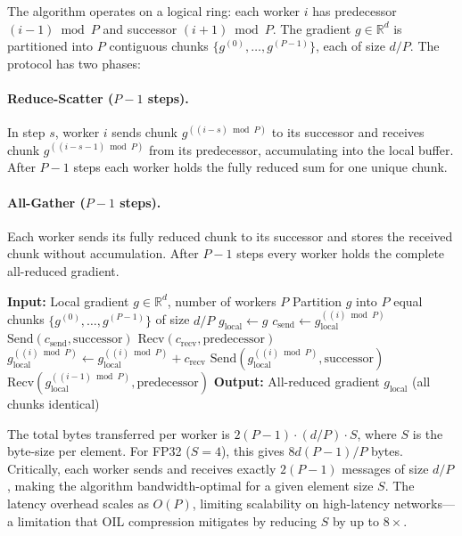 The algorithm operates on a logical ring: each worker $i$ has predecessor $(i-1) \bmod P$ and successor $(i+1) \bmod P$. The gradient $g \in \mathbb{R}^d$ is partitioned into $P$ contiguous chunks $\{g^{(0)},\dots,g^{(P-1)}\}$, each of size $d/P$. The protocol has two phases:

\paragraph{Reduce-Scatter ($P-1$ steps).} In step $s$, worker $i$ sends chunk $g^{((i-s) \bmod P)}$ to its successor and receives chunk $g^{((i-s-1) \bmod P)}$ from its predecessor, accumulating into the local buffer. After $P-1$ steps each worker holds the fully reduced sum for one unique chunk.

\paragraph{All-Gather ($P-1$ steps).} Each worker sends its fully reduced chunk to its successor and stores the received chunk without accumulation. After $P-1$ steps every worker holds the complete all-reduced gradient.

\begin{algorithm}[H]
\caption{Standard Ring All-Reduce (Reduce-Scatter + All-Gather)}
\label{alg:ring_reducescatter}
\begin{algorithmic}[1]
\STATE \textbf{Input:} Local gradient $g \in \mathbb{R}^d$, number of workers $P$
\STATE Partition $g$ into $P$ equal chunks $\{g^{(0)}, \dots, g^{(P-1)}\}$ of size $d/P$
\STATE $g_{\text{local}} \gets g$
    \STATE $c_{\text{send}} \gets g_{\text{local}}^{((i) \bmod P)}$
    \STATE $\text{Send}(c_{\text{send}}, \text{successor})$ 
    \STATE $\text{Recv}(c_{\text{recv}}, \text{predecessor})$
    \STATE $g_{\text{local}}^{((i) \bmod P)} \gets g_{\text{local}}^{((i) \bmod P)} + c_{\text{recv}}$
\ENDFOR
{}
    \STATE $\text{Send}(g_{\text{local}}^{((i) \bmod P)}, \text{successor})$
    \STATE $\text{Recv}(g_{\text{local}}^{((i-1) \bmod P)}, \text{predecessor})$
\ENDFOR
\STATE \textbf{Output:} All-reduced gradient $g_{\text{local}}$ (all chunks identical)
\end{algorithmic}
\end{algorithm}

The total bytes transferred per worker is $2(P-1) \cdot (d/P) \cdot S$, where $S$ is the byte-size per element. For FP32 ($S = 4$), this gives $8d(P-1)/P$ bytes. Critically, each worker sends and receives exactly $2(P-1)$ messages of size $d/P$, making the algorithm bandwidth-optimal for a given element size $S$. The latency overhead scales as $O(P)$, limiting scalability on high-latency networks---a limitation that OIL compression mitigates by reducing $S$ by up to $8\times$.

